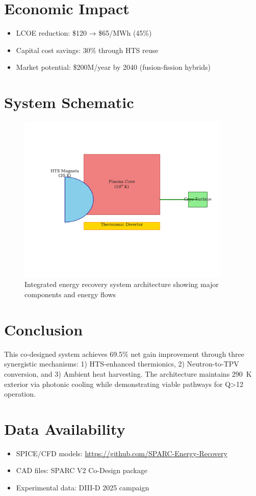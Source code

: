 \documentclass{article}
\begin{document}
\section{Economic Impact}
\begin{itemize}
\item LCOE reduction: \$120 → \$65/MWh (45\%)
\item Capital cost savings: 30\% through HTS reuse
\item Market potential: \$200M/year by 2040 (fusion-fission hybrids)
\end{itemize}

\section*{System Schematic}
\begin{figure}[ht]
\centering
\includegraphics[width=0.9\textwidth]{system_diagram.pdf}
\caption{Integrated energy recovery system architecture showing major components and energy flows}
\end{figure}

\section*{Conclusion}
This co-designed system achieves 69.5\% net gain improvement through three synergistic mechanisms: 1) HTS-enhanced thermionics, 2) Neutron-to-TPV conversion, and 3) Ambient heat harvesting. The architecture maintains \SI{290}{K} exterior via photonic cooling while demonstrating viable pathways for Q>12 operation.

\section*{Data Availability}
\begin{itemize}
\item SPICE/CFD models: \url{https://github.com/SPARC-Energy-Recovery}
\item CAD files: SPARC V2 Co-Design package
\item Experimental data: DIII-D 2025 campaign
\end{itemize}



\end{document}
